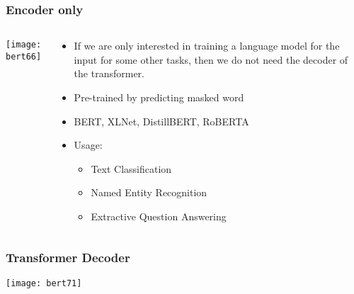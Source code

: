\begin{frame}[fragile]\frametitle{Encoder only}

\begin{columns}
    \begin{column}[T]{0.5\linewidth}
			\begin{center}
			\texttt{[image: bert66]}
			\end{center}		
		\end{column}
    \begin{column}[T]{0.5\linewidth}
      \begin{itemize}
			\item If we are only interested in training a language model for the input for some other tasks, then we do not need the decoder of the transformer. 
			\item Pre-trained by predicting masked word
			\item BERT, XLNet, DistillBERT, RoBERTA
			\item Usage:
      \begin{itemize}
			\item Text Classification
			\item Named Entity Recognition
			\item Extractive Question Answering
			\end{itemize}
			\end{itemize}
    \end{column}
  \end{columns}
			
\end{frame}

\begin{frame}[fragile]\frametitle{Transformer Decoder}


			\begin{center}
			\texttt{[image: bert71]}
			\end{center}		

			
\end{frame}


